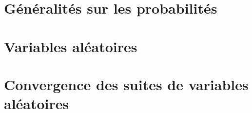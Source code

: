 \documentclass[french]{report}
\theoremstyle{plain}
\theoremstyle{definition}
\theoremstyle{remark}
\begin{document}
\chapter{Généralités sur les probabilités}



\chapter{Variables aléatoires}



\chapter{Convergence des suites de variables aléatoires}


\end{document}
